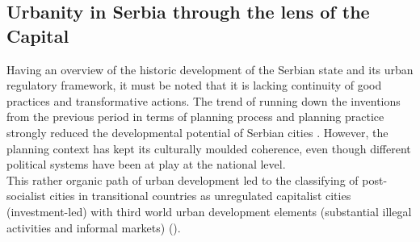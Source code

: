 \documentclass[11pt]{report}
\begin{document}
\subsection{Urbanity in Serbia through the lens of the Capital}

Having an overview of the historic development of the Serbian state and its urban regulatory framework, it must be noted that it is lacking continuity of good practices and transformative actions. The trend of running down the inventions from the previous period in terms of planning process and planning practice strongly reduced the developmental potential of Serbian cities \href{ref}{\citealt{peric_evolution_2016}}. However, the planning context has kept its culturally moulded coherence, even though different political systems have been at play at the national level.
\\  
  
This rather organic path of urban development led to the classifying of post-socialist cities in transitional countries as unregulated capitalist cities (investment-led) with third world urban development elements (substantial illegal activities and informal markets) (\href{ref}{\citealt{petrovic_cities_2009}}).
\\ 
\end{document}
